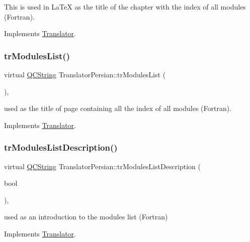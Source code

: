 This is used in La\+TeX as the title of the chapter with the index of all modules (Fortran). 

Implements \mbox{\hyperlink{class_translator}{Translator}}.

\mbox{\label{class_translator_persian_afd9648acb0b50c362968dae4a5a9a4fa}} 
\subsubsection{\texorpdfstring{trModulesList()}{trModulesList()}}
{\footnotesize\ttfamily virtual \mbox{\hyperlink{class_q_c_string}{Q\+C\+String}} Translator\+Persian\+::tr\+Modules\+List (\begin{DoxyParamCaption}{ }\end{DoxyParamCaption})\hspace{0.3cm}{\ttfamily [inline]}, {\ttfamily [virtual]}}

used as the title of page containing all the index of all modules (Fortran). 

Implements \mbox{\hyperlink{class_translator}{Translator}}.

\mbox{\label{class_translator_persian_af5c8699a8b0145943768b40867049c1d}} 
\subsubsection{\texorpdfstring{trModulesListDescription()}{trModulesListDescription()}}
{\footnotesize\ttfamily virtual \mbox{\hyperlink{class_q_c_string}{Q\+C\+String}} Translator\+Persian\+::tr\+Modules\+List\+Description (\begin{DoxyParamCaption}\item[{bool}]{ }\end{DoxyParamCaption})\hspace{0.3cm}{\ttfamily [inline]}, {\ttfamily [virtual]}}

used as an introduction to the modules list (Fortran) 

Implements \mbox{\hyperlink{class_translator}{Translator}}.


